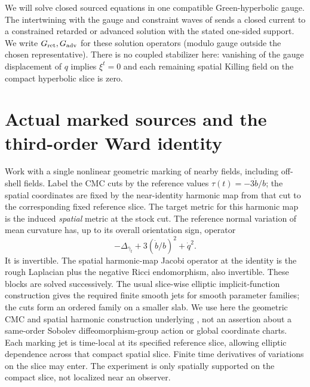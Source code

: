 \documentclass[11pt]{article}
\newcommand{\Rret}{G_{\rm ret}}
\newcommand{\Radv}{G_{\rm adv}}
\numberwithin{equation}{section}
\begin{document}
We will solve closed sourced equations in one compatible Green-hyperbolic gauge. The intertwining with the gauge and constraint waves of \cite{p71} sends a closed current to a constrained retarded or advanced solution with the stated one-sided support. We write $\Rret,\Radv$ for these solution operators (modulo gauge outside the chosen representative). There is no coupled stabilizer here: vanishing of the gauge displacement of $q$ implies $\xi^t=0$ and each remaining spatial Killing field on the compact hyperbolic slice is zero.

\section{Actual marked sources and the third-order Ward identity}\label{sec:ward}

Work with a single nonlinear geometric marking of nearby fields, including off-shell fields. Label the CMC cuts by the reference values $\tau(t)=-3\dot b/b$; the spatial coordinates are fixed by the near-identity harmonic map from that cut to the corresponding fixed reference slice. The target metric for this harmonic map is the induced \emph{spatial} metric at the stock cut. The reference normal variation of mean curvature has, up to its overall orientation sign, operator
\[
       -\Delta_{\bar\gamma_t}+3(\dot b/b)^2+\dot q^2 .
\]
It is invertible. The spatial harmonic-map Jacobi operator at the identity is the rough Laplacian plus the negative Ricci endomorphism, also invertible. These blocks are solved successively. The usual slice-wise elliptic implicit-function construction gives the required finite smooth jets for smooth parameter families; the cuts form an ordered family on a smaller slab. We use here the geometric CMC and spatial harmonic construction underlying \cite{am,p64}, not an assertion about a same-order Sobolev diffeomorphism-group action or global coordinate charts. Each marking jet is time-local at its specified reference slice, allowing elliptic dependence across that compact spatial slice. Finite time derivatives of variations on the slice may enter. The experiment is only spatially supported on the compact slice, not localized near an observer.
\end{document}
